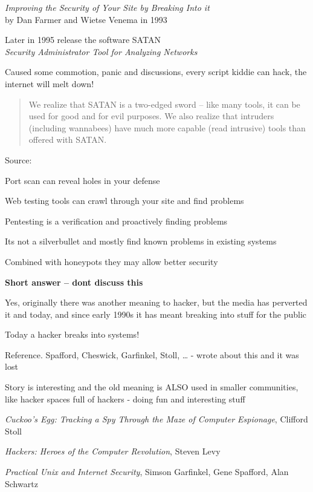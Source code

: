\documentclass[Screen16to9,17pt]{foils}
\begin{document}
\begin{list1}
\item \emph{Improving the Security of Your Site by Breaking Into it}\\ by
Dan Farmer and Wietse Venema in 1993
\item Later in 1995 release the software SATAN\\
\emph{Security Administrator Tool for Analyzing Networks}
\item Caused some commotion, panic and discussions, every script kiddie can hack, the internet will melt down!
\vskip 5mm
\begin{quote}
We realize that SATAN is a two-edged sword -- like
many tools, it can be used for good and for evil
purposes. We also realize that intruders (including
wannabees) have much more capable (read intrusive)
tools than offered with SATAN.
\end{quote}
\end{list1}

\vskip 1cm
Source:



\begin{list1}
\item Port scan can reveal holes in your defense
\item Web testing tools can crawl through your site and find problems
\item Pentesting is a verification and proactively finding problems
\item Its not a silverbullet and mostly find known problems in existing systems
\item Combined with honeypots they may allow better security
\end{list1}



{\bfseries Short answer -- dont discuss this}

Yes, originally there was another meaning to hacker, but the media has perverted it and today, and since early 1990s it has meant breaking into stuff for the public

{\color{red}\hlkbig Today a hacker breaks into systems!}

Reference. Spafford, Cheswick, Garfinkel, Stoll, \ldots
- wrote about this and it was lost

Story is interesting and the old meaning is ALSO used in smaller communities, like hacker spaces full of hackers - doing fun and interesting stuff
\begin{list2}
\item \emph{Cuckoo's Egg: Tracking a Spy Through the Maze of Computer
 Espionage},  Clifford Stoll
\item \emph{Hackers: Heroes of the Computer Revolution},
Steven Levy
\item \emph{Practical Unix and Internet Security},
Simson Garfinkel, Gene Spafford, Alan Schwartz
\end{list2}
\end{document}
